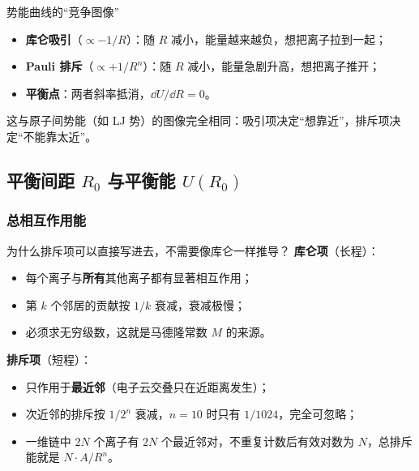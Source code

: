 \begin{insightbox}{势能曲线的``竞争图像''}
\begin{itemize}[nosep]
  \item \textbf{库仑吸引}（$\propto -1/R$）：随 $R$ 减小，能量越来越负，想把离子拉到一起；
  \item \textbf{Pauli 排斥}（$\propto +1/R^n$）：随 $R$ 减小，能量急剧升高，想把离子推开；
  \item \textbf{平衡点}：两者斜率抵消，$\dd U/\dd R = 0$。
\end{itemize}
这与原子间势能（如 LJ 势）的图像完全相同：吸引项决定``想靠近''，排斥项决定``不能靠太近''。
\end{insightbox}

\subsection{平衡间距 $R_0$ 与平衡能 $U(R_0)$}

\subsubsection{总相互作用能}

\begin{modelbox}{为什么排斥项可以直接写进去，不需要像库仑一样推导？}
\textbf{库仑项}（长程）：
\begin{itemize}[nosep]
  \item 每个离子与\textbf{所有}其他离子都有显著相互作用；
  \item 第 $k$ 个邻居的贡献按 $1/k$ 衰减，衰减极慢；
  \item 必须求无穷级数，这就是马德隆常数 $M$ 的来源。
\end{itemize}

\textbf{排斥项}（短程）：
\begin{itemize}[nosep]
  \item 只作用于\textbf{最近邻}（电子云交叠只在近距离发生）；
  \item 次近邻的排斥按 $1/2^n$ 衰减，$n=10$ 时只有 $1/1024$，完全可忽略；
  \item 一维链中 $2N$ 个离子有 $2N$ 个最近邻对，不重复计数后有效对数为 $N$，总排斥能就是 $N \cdot A/R^n$。
\end{itemize}
\end{modelbox}

